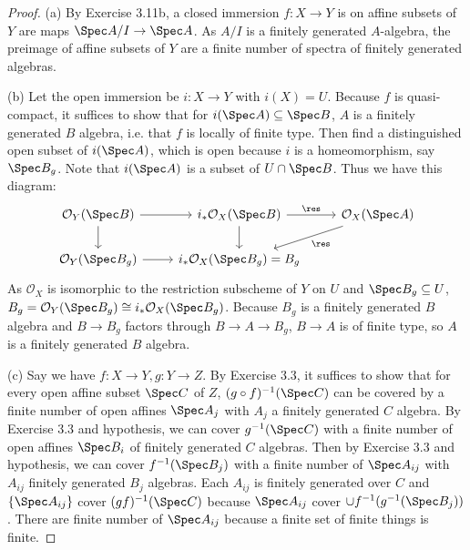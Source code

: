 \begin{proof}
	(a) By Exercise 3.11b, a closed immersion $f:X\to Y $ is on affine subsets of $Y $ are maps $\Spec A / I \to \Spec A $.
	As $A / I $ is a finitely generated $A $-algebra, the preimage of affine subsets of $Y $ are a finite number of spectra of finitely generated algebras.

	(b) Let the open immersion be $i:X\to Y $ with $i(X) =U$.
	Because $f $ is quasi-compact, it suffices to show that for $i(\Spec A) \subseteq \Spec B $, $A $ is a finitely generated $B $ algebra, i.e. that $f $ is locally of finite type.
	Then find a distinguished open subset of $i(\Spec A)$, which is open because $i $ is a homeomorphism, say $\Spec B_g $.
	Note that $i(\Spec A) $ is a subset of $U\cap \Spec B $.
	Thus we have this diagram:
	\[
	\begin{tikzcd}
		\mathcal{O}_{Y}(\Spec B) & i_\ast \mathcal{O}_{X}(\Spec B) & \mathcal{O}_X(\Spec A)\\
		\mathcal{O}_{Y}(\Spec B_g) & i_\ast \mathcal{O}_{X}(\Spec B_g) = B_g &
	\arrow[from=1-1,to=1-2]
	\arrow[from=1-1,to=2-1]
	\arrow[from=2-1,to=2-2]
	\arrow[from=1-2,to=2-2]
	\arrow["\res",from=1-3,to=2-2]
	\arrow["\res",from=1-2,to=1-3]
	\end{tikzcd}
	\]
	As $\mathcal{O}_{X}$ is isomorphic to the restriction subscheme of $Y $ on $U $ and $\Spec B_g \subseteq U $, $B_g = \mathcal{O}_{Y}(\Spec B_g) \cong i_\ast \mathcal{O}_{X}(\Spec B_g)$.
	Because $B_g $ is a finitely generated $B $ algebra and $B\to B_g $ factors through $B\to A \to B_g $, $B\to A $ is of finite type, so $A $ is a finitely generated $B $ algebra.

	(c) Say we have $f: X\to Y, g: Y\to Z $.
	By Exercise 3.3, it suffices to show that for every open affine subset $\Spec C $ of $Z $, $(g\circ f)^{-1}(\Spec C) $ can be covered by a finite number of open affines $\Spec A_j $ with $A_j $ a finitely generated $C $ algebra.
	By Exercise 3.3 and hypothesis, we can cover $g^{-1}(\Spec C) $ with a finite number of open affines $\Spec B_i $ of finitely generated $C $ algebras.
	Then by Exercise 3.3 and hypothesis, we can cover $f^{-1}(\Spec B_j)$ with a finite number of $\Spec A_{ij} $ with $A_{ij} $ finitely generated $B_j $ algebras.
	Each $A_{ij} $ is finitely generated over $C $ and $\{\Spec A_{ij}\}   $ cover $(gf)^{-1}(\Spec C) $ because $\Spec A_{ij} $ cover $\cup f^{-1}(g^{-1}(\Spec B_j)) $.
	There are finite number of $\Spec A_{ij} $ because a finite set of finite things is finite.


\end{proof}
